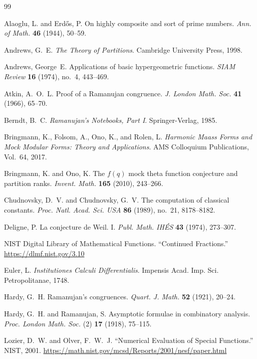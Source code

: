 \documentclass[10pt]{amsart}
\theoremstyle{plain}
\theoremstyle{definition}
\theoremstyle{remark}
\begin{document}
\begin{thebibliography}{99}

Alaoglu, L. and Erd\H{o}s, P.
On highly composite and sort of prime numbers.
\textit{Ann. of Math.} \textbf{46} (1944), 50--59.

Andrews, G.~E.
\textit{The Theory of Partitions}.
Cambridge University Press, 1998.

Andrews, George~E.
Applications of basic hypergeometric functions.
\textit{SIAM Review} \textbf{16} (1974), no.~4, 443--469.

Atkin, A.~O.~L.
Proof of a Ramanujan congruence.
\textit{J. London Math. Soc.} \textbf{41} (1966), 65--70.

Berndt, B.~C.
\textit{Ramanujan's Notebooks, Part I}.
Springer-Verlag, 1985.

Bringmann, K., Folsom, A., Ono, K., and Rolen, L.
\textit{Harmonic Maass Forms and Mock Modular Forms:
Theory and Applications}.
AMS Colloquium Publications, Vol.~64, 2017.

Bringmann, K. and Ono, K.
The $f(q)$ mock theta function conjecture and partition ranks.
\textit{Invent. Math.} \textbf{165} (2010), 243--266.

Chudnovsky, D.~V. and Chudnovsky, G.~V.
The computation of classical constants.
\textit{Proc. Natl. Acad. Sci. USA} \textbf{86} (1989), no.~21, 8178--8182.

Deligne, P.
La conjecture de Weil. I.
\textit{Publ. Math. IH\'ES} \textbf{43} (1974), 273--307.

NIST Digital Library of Mathematical Functions.
``Continued Fractions.''
\url{https://dlmf.nist.gov/3.10}

Euler, L.
\textit{Institutiones Calculi Differentialis}.
Impensis Acad. Imp. Sci. Petropolitanae, 1748.

Hardy, G.~H.
Ramanujan's congruences.
\textit{Quart. J. Math.} \textbf{52} (1921), 20--24.

Hardy, G.~H. and Ramanujan, S.
Asymptotic formulae in combinatory analysis.
\textit{Proc. London Math. Soc.} (2) \textbf{17} (1918), 75--115.

Lozier, D.~W. and Olver, F.~W.~J.
``Numerical Evaluation of Special Functions.''
NIST, 2001.
\url{https://math.nist.gov/mcsd/Reports/2001/nesf/paper.html}


\end{thebibliography}
\end{document}
